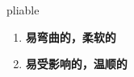 
\begin{frame}
{\huge pliable}
\begin{center}
\begin{enumerate}\Large
  \item \textbf{易弯曲的，柔软的}
  \item \textbf{易受影响的，温顺的}
\end{enumerate}
\end{center}
\end{frame}
